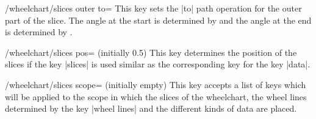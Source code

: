 \documentclass[a4paper,english,dvipsnames]{ltxdoc}
\begin{document}
\begin{key}{/wheelchart/slices outer to=}
This key sets the |to| path operation for the outer part of the slice. The angle at the start is determined by  and the angle at the end is determined by .
\begin{codeexample}[width=10cm]
\begin{tikzpicture}[looseness=3]
\wheelchart[
    data=,
    radius={0}{2.5},
    slices arc={0.4}{0},
    slices outer to={70}{70},
    start half,
    value=1,
    wheel data=\WCvarC,
    wheel data pos=1
]{\exampleforthismanual}
\end{tikzpicture}
\end{codeexample}
\end{key}
\begin{key}{/wheelchart/slices pos= (initially 0.5)}
This key determines the position of the slices if the key |slices| is used similar as the corresponding key for the key |data|.
\end{key}
\begin{stylekey}{/wheelchart/slices scope= (initially \normalfont empty)}
This key accepts a list of keys which will be applied to the scope in which the slices of the wheelchart, the wheel lines determined by the key |wheel lines| and the different kinds of data are placed.
\begin{codeexample}[width=10cm]
\begin{tikzpicture}
\wheelchart[
    data=,
    radius={3.9}{4.5},
    slices inner arc={0}{0},
    slices outer angle reduce=5*90/7,
    slices outer arc={0}{0},
    slices scope={
        shift={
            ($(90+\WCmidangle:0.559572)
            +(\WCmidangle:-1.16196)$)
        }
    },
    value=1,
    wheel data=\WCvarC,
    wheel data pos=0,
    wheel data style={
        rotate=\WCmidangle-90
    }
]{\exampleforthismanual}
\end{tikzpicture}
\end{codeexample}
\begin{codeexample}[width=10cm,preamble={\usepackage{siunitx}}]
\begin{tikzpicture}
\wheelchart[
    data=\WCvarC\\%
        \qty{\fpeval{\WCvarA/2}}%
        {\percent},
    radius={0.5}{0.5+0.1*\WCvarA},
    slices inner arc tangent,
    slices outer angle reduce=
        180/\WCtotalcount,
    slices outer arc tangent,
    slices scope={shift={(\WCmidangle:
        {-cos(180/\WCtotalcount)/2})}},
    value=1
]{\exampleforthismanual}
\end{tikzpicture}
\end{codeexample}
\end{stylekey}
\end{document}
